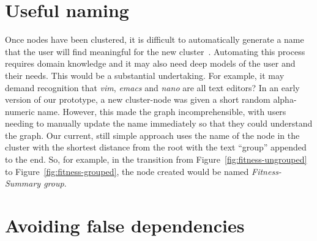 \section{Useful naming}

Once nodes have been clustered, it is difficult to automatically generate a name 
that the user will find meaningful for the new cluster~\cite{Schaffer1996, Abello2006}. 
Automating this process requires domain knowledge and it may also need deep models of the user and their needs.
This would be a substantial undertaking. 
For example, it may demand recognition that \textit{vim}, \textit{emacs} and \textit{nano} are all text editors? 
In an early version of our prototype, a new cluster-node was given a short random alpha-numeric name. 
However, this made the graph incomprehensible, with users needing to manually update the name immediately
so that they could understand the graph. 
Our current, still simple approach uses the name of the node in the cluster with the shortest distance from the root with the text ``group'' appended to the end. 
So, for example, in the transition from Figure~\ref{fig:fitness-ungrouped} to Figure~\ref{fig:fitness-grouped}, the node created would be named \textit{Fitness-Summary group}.


\section{Avoiding false dependencies}

